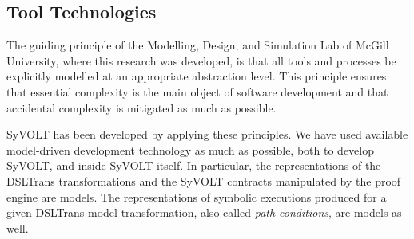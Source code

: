 %
%
%


\subsection{Tool Technologies}


The guiding principle of the Modelling, Design, and Simulation Lab of McGill University, where this research was developed, is that all tools and processes be
explicitly modelled at an appropriate abstraction level. This principle ensures that essential complexity is the main object of software development and that accidental complexity is mitigated as much as possible.

SyVOLT has been developed by applying these principles. We have used available
model-driven development technology as much as possible, both to develop SyVOLT,
and inside SyVOLT itself. In particular, the representations of the DSLTrans
transformations and the SyVOLT contracts manipulated by the proof engine are
models. The representations of symbolic executions produced for a given DSLTrans
model transformation, also called \emph{path conditions}, are models as well.

